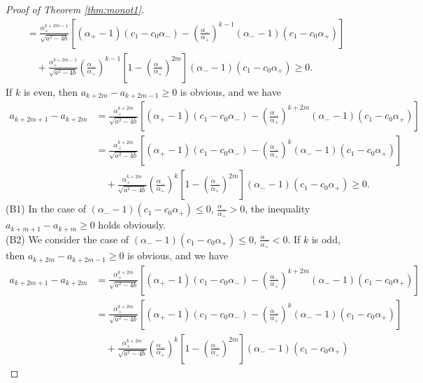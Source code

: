\documentclass[a4paper,11pt,reqno]{amsart}
\theoremstyle{plain}
\theoremstyle{definition}
\begin{document}
\begin{proof}[Proof of Theorem \ref{thm:monot1}]
\begin{align*}
   &=
   \frac{\alpha _{+}^{k+2m-1}}{\sqrt{a^{2}-4b}}
   \left[(\alpha _{+}-1)(c_{1}-c_{0}\alpha _{-})-\left(\frac{\alpha _{-}}{\alpha _{+}}\right)^{k-1}(\alpha _{-}-1)(c_{1}-c_{0}\alpha _{+})\right] \\
   & \quad +
   \frac{\alpha _{+}^{k+2m-1}}{\sqrt{a^{2}-4b}}\left(\frac{\alpha _{-}}{\alpha _{+}}\right)^{k-1}\left[1-\left(\frac{\alpha _{-}}{\alpha _{+}}\right)^{2m}\right](\alpha _{-}-1)(c_{1}-c_{0}\alpha _{+})
   \geq 0.
\end{align*}
If $k$ is even, then $a_{k+2m}-a_{k+2m-1}\geq 0$ is obvious, and we have 
\begin{align*}
a_{k+2m+1}-a_{k+2m}
   &=
   \frac{\alpha _{+}^{k+2m}}{\sqrt{a^{2}-4b}}
   \left[(\alpha _{+}-1)(c_{1}-c_{0}\alpha _{-})-\left(\frac{\alpha _{-}}{\alpha _{+}}\right)^{k+2m}(\alpha _{-}-1)(c_{1}-c_{0}\alpha _{+})\right] \\
   &=
   \frac{\alpha _{+}^{k+2m}}{\sqrt{a^{2}-4b}}
   \left[(\alpha _{+}-1)(c_{1}-c_{0}\alpha _{-})-\left(\frac{\alpha _{-}}{\alpha _{+}}\right)^{k}(\alpha _{-}-1)(c_{1}-c_{0}\alpha _{+})\right] \\
   & \quad +
   \frac{\alpha _{+}^{k+2m}}{\sqrt{a^{2}-4b}}
   \left(\frac{\alpha _{-}}{\alpha _{+}}\right)^{k}\left[1-\left(\frac{\alpha _{-}}{\alpha _{+}}\right)^{2m}\right](\alpha _{-}-1)(c_{1}-c_{0}\alpha _{+})
   \geq 0.
\end{align*}
(B1) 
In the case of $(\alpha _{-}-1)(c_{1}-c_{0}\alpha _{+})\leq 0$, $\frac{\alpha _{-}}{\alpha _{+}}>0$, 
the inequality $a_{k+m+1}-a_{k+m} \geq 0$ holds obviously. 
\\
(B2) 
We consider the case of $(\alpha _{-}-1)(c_{1}-c_{0}\alpha _{+})\leq 0$, $\frac{\alpha _{-}}{\alpha _{+}}<0$. 
If $k$ is odd, then $a_{k+2m}-a_{k+2m-1}\geq 0$ is obvious, and we have 
\begin{align*}
a_{k+2m+1}-a_{k+2m}
   &=
   \frac{\alpha _{+}^{k+2m}}{\sqrt{a^{2}-4b}}
   \left[(\alpha _{+}-1)(c_{1}-c_{0}\alpha _{-})-\left(\frac{\alpha _{-}}{\alpha _{+}}\right)^{k+2m}(\alpha _{-}-1)(c_{1}-c_{0}\alpha _{+})\right] \\
   &=
   \frac{\alpha _{+}^{k+2m}}{\sqrt{a^{2}-4b}}
   \left[(\alpha _{+}-1)(c_{1}-c_{0}\alpha _{-})-\left(\frac{\alpha _{-}}{\alpha _{+}}\right)^{k}(\alpha _{-}-1)(c_{1}-c_{0}\alpha _{+})\right] \\
   & \quad +
   \frac{\alpha _{+}^{k+2m}}{\sqrt{a^{2}-4b}}
   \left(\frac{\alpha _{-}}{\alpha _{+}}\right)^{k}\left[1-\left(\frac{\alpha _{-}}{\alpha _{+}}\right)^{2m}\right](\alpha _{-}-1)(c_{1}-c_{0}\alpha _{+})

\end{align*}
\end{proof}
\end{document}
